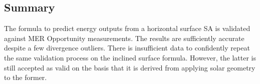 

\subsection{Summary}
The formula to predict energy outputs from a horizontal surface \ac{SA} is validated against \ac{MER} Opportunity measurements. The results are sufficiently accurate despite a few divergence outliers. There is insufficient data to confidently repeat the same validation process on the inclined surface formula. However, the latter is still accepted as valid on the basis that it is derived from applying solar geometry to the former. 
